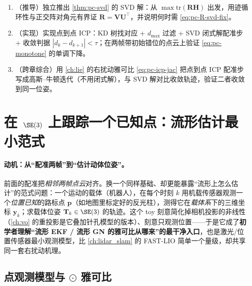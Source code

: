 \begin{practice}
\begin{enumerate}
  \item （推导）独立推出 \cref{thm:pc-svd} 的 SVD 解：从 $\max\mathrm{tr}(\mathbf{R}\mathbf{H})$ 出发，用迹循环性与正交阵对角元有界证 $\mathbf{R}=\mathbf{V}\mathbf{U}^\top$，并说明何时需 \cref{eq:pc-R-svd-fix}。
  \item （实现）实现点到点 ICP：KD 树找对应 + $d_{\max}$ 过滤 + SVD 闭式解配准步 + 收敛判据 $|d_k-d_{k+1}|<\tau$；在两帧带初始错位的点云上验证 \cref{eq:pc-monotone} 的单调下降。
  \item （跨章综合）用 \cref{ch:lie} 的右扰动雅可比 \cref{eq:pc-icp-jac} 把点到点 ICP 配准步写成高斯--牛顿迭代（不用闭式解），与 SVD 解对比收敛轨迹，验证二者收敛到同一位姿。
\end{enumerate}
\end{practice}

\section{在 \texorpdfstring{$\SE(3)$}{(3)} 上跟踪一个已知点：流形估计最小范式}
\label{sec:pc-track-point}

\paragraph{动机：从“配准两帧”到“估计动体位姿”。}
前面的配准把\emph{相邻两帧点云}对齐。换一个同样基础、却更能暴露“流形上怎么估计”的范式问题\cite{barfoot2024state}：一个运动的载体（机器人），在每个时刻 $k$ 用机载传感器观测一个\emph{位置已知}的路标点 $\mathbf{p}$（如地图里标定好的反光柱），测得它在\emph{载体系}下的三维坐标 $\mathbf{y}_k$；求载体位姿 $\mathbf{T}_k\in\SE(3)$ 的轨迹。这个 toy 刻意简化掉相机投影的非线性（\cref{ch:vo} 的重投影是它叠加针孔模型的版本）、刻意只观测位置——于是它成了\textbf{初学者理解“流形 EKF / 流形 GN 的雅可比从哪来”的最干净入口}，也是激光/位置传感器最小观测模型，比 \cref{ch:lidar_slam} 的 FAST-LIO 简单一个量级，却共享同一套右扰动机理。

\subsection{点观测模型与 \texorpdfstring{$\odot$}{x} 雅可比}
\label{sec:pc-track-model}

